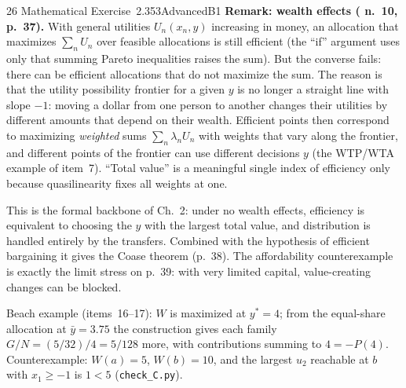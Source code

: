 \begin{exsol}{26}{\MR{} Mathematical Exercise~2.3}{53}{Advanced}{B1}
\textbf{Remark: wealth effects (\MR{} n.~10, p.~37).} With general utilities $U_n(x_n, y)$
increasing in money, an allocation that maximizes $\sum_n U_n$ over feasible allocations is
still efficient (the ``if'' argument uses only that summing Pareto inequalities raises the sum).
But the converse fails: there can be efficient allocations that do not maximize the sum. The
reason is that the utility possibility frontier for a given $y$ is no longer a straight line with
slope $-1$: moving a dollar from one person to another changes their utilities by different amounts
that depend on their wealth. Efficient points then correspond to maximizing \emph{weighted} sums
$\sum_n \lambda_n U_n$ with weights that vary along the frontier, and different points of the
frontier can use different decisions $y$ (the WTP/WTA example of item~7). ``Total value'' is a
meaningful single index of efficiency only because quasilinearity fixes all weights at one.

\interp This is the formal backbone of \MR{} Ch.~2: under no wealth effects, efficiency is
equivalent to choosing the $y$ with the largest total value, and distribution is handled entirely
by the transfers. Combined with the hypothesis of efficient bargaining it gives the Coase theorem
(p.~38). The affordability counterexample is exactly the limit \MR{} stress on p.~39: with very
limited capital, value-creating changes can be blocked.

\verify Beach example (items~16--17): $W$ is maximized at $y^* = 4$; from the equal-share
allocation at $\bar y = 3.75$ the construction gives each family $G/N = (5/32)/4 = 5/128$ more, with
contributions summing to $4 = -P(4)$. Counterexample: $W(a) = 5$, $W(b) = 10$, and the largest
$u_2$ reachable at $b$ with $x_1 \ge -1$ is $1 < 5$ (\texttt{check\_C.py}).

\end{exsol}
